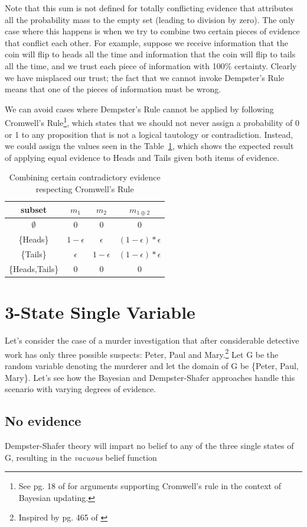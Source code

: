 \documentclass[letterpaper]{article}
\begin{document}
Note that this sum is not defined for totally conflicting evidence that attributes all the probability mass to the empty set (leading to division by zero).  The only case where this happens is when we try to combine two certain pieces of evidence that conflict each other.  For example, suppose we receive information that the coin will flip to heads all the time and information that the coin will flip to tails all the time, and we trust each piece of information with 100\% certainty.  Clearly we have misplaced our trust; the fact that we cannot invoke Dempster's Rule means that one of the pieces of information must be wrong.  

We can avoid cases where Dempster's Rule cannot be applied by following Cromwell's Rule\footnote{See pg. 18 of \cite{Jackman2009} for arguments supporting Cromwell's rule in the context of Bayesian updating.}, which states that we should not never assign a probability of 0 or 1 to any proposition that is not a logical tautology or contradiction.  Instead, we could assign the values seen in the Table~\ref{tab:CombineCoinCromwell}, which shows the expected result of applying equal evidence to Heads and Tails given both items of evidence.

\begin{table}[htbp]
\centering
\caption{Combining certain contradictory evidence respecting Cromwell's Rule}
\begin{tabular}{|c|c|c|c|}
\hline
subset & $m_1$ & $m_2$ & $m_{1 \oplus 2}$ \\
\hline
$\emptyset$ & 0 & 0 & 0 \\
\{Heads\} & $1-\epsilon$ & $\epsilon$ & $(1-\epsilon)*\epsilon$ \\
\{Tails\} & $\epsilon$ & $1-\epsilon$ & $(1-\epsilon)*\epsilon$ \\
\{Heads,Tails\} & 0 & 0 & 0 \\
\hline
\end{tabular}
\label{tab:CombineCoinCromwell}
\end{table}

\section{3-State Single Variable}
Let's consider the case of a murder investigation that after considerable detective work has only three possible suspects: Peter, Paul and Mary.\footnote{Inspired by pg. 465 of \cite{Pearl1988}}  Let G be the random variable denoting the murderer and let the domain of G be \{Peter, Paul, Mary\}.  Let's see how the Bayesian and Dempster-Shafer approaches handle this scenario with varying degrees of evidence. 

\subsection{No evidence}

Dempster-Shafer theory will impart no belief to any of the three single states of G, resulting in the \textit{vacuous} belief function




\end{document}
